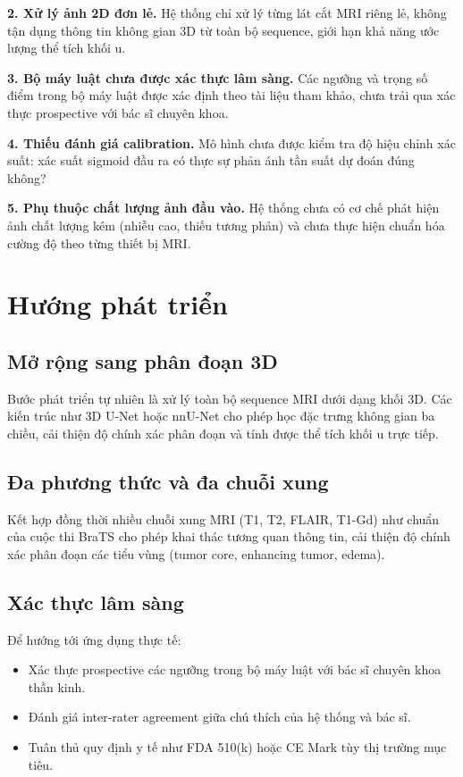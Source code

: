 \textbf{2. Xử lý ảnh 2D đơn lẻ.}
Hệ thống chỉ xử lý từng lát cắt MRI riêng lẻ, không tận dụng thông tin không gian 3D từ toàn bộ sequence, giới hạn khả năng ước lượng thể tích khối u.

\textbf{3. Bộ máy luật chưa được xác thực lâm sàng.}
Các ngưỡng và trọng số điểm trong bộ máy luật được xác định theo tài liệu tham khảo, chưa trải qua xác thực prospective với bác sĩ chuyên khoa.

\textbf{4. Thiếu đánh giá calibration.}
Mô hình chưa được kiểm tra độ hiệu chỉnh xác suất: xác suất sigmoid đầu ra có thực sự phản ánh tần suất dự đoán đúng không?

\textbf{5. Phụ thuộc chất lượng ảnh đầu vào.}
Hệ thống chưa có cơ chế phát hiện ảnh chất lượng kém (nhiễu cao, thiếu tương phản) và chưa thực hiện chuẩn hóa cường độ theo từng thiết bị MRI.

\section{Hướng phát triển}

\subsection{Mở rộng sang phân đoạn 3D}

Bước phát triển tự nhiên là xử lý toàn bộ sequence MRI dưới dạng khối 3D. Các kiến trúc như 3D U-Net hoặc nnU-Net cho phép học đặc trưng không gian ba chiều, cải thiện độ chính xác phân đoạn và tính được thể tích khối u trực tiếp.

\subsection{Đa phương thức và đa chuỗi xung}

Kết hợp đồng thời nhiều chuỗi xung MRI (T1, T2, FLAIR, T1-Gd) như chuẩn của cuộc thi BraTS \cite{Menze2015} cho phép khai thác tương quan thông tin, cải thiện độ chính xác phân đoạn các tiểu vùng (tumor core, enhancing tumor, edema).

\subsection{Xác thực lâm sàng}

Để hướng tới ứng dụng thực tế:
\begin{itemize}
    \item Xác thực prospective các ngưỡng trong bộ máy luật với bác sĩ chuyên khoa thần kinh.
    \item Đánh giá inter-rater agreement giữa chú thích của hệ thống và bác sĩ.
    \item Tuân thủ quy định y tế như FDA 510(k) hoặc CE Mark tùy thị trường mục tiêu.
\end{itemize}

